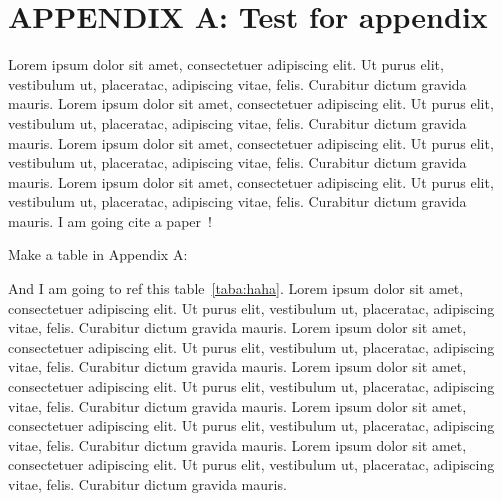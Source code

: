 \newcommand{\hbAppendixPrefix}{A}
\renewcommand{\thefigure}{\hbAppendixPrefix.\arabic{figure}}
\setcounter{figure}{0}
\renewcommand{\thetable}{\hbAppendixPrefix.\arabic{table}} 
\setcounter{table}{0}

\section{APPENDIX \hbAppendixPrefix: Test for appendix}

Lorem ipsum dolor sit amet, consectetuer adipiscing elit.  Ut purus elit, vestibulum ut, placeratac,  adipiscing vitae,  felis.   Curabitur dictum gravida mauris.  
Lorem ipsum dolor sit amet, consectetuer adipiscing elit.  Ut purus elit, vestibulum ut, placeratac,  adipiscing vitae,  felis.   Curabitur dictum gravida mauris.  
Lorem ipsum dolor sit amet, consectetuer adipiscing elit.  Ut purus elit, vestibulum ut, placeratac,  adipiscing vitae,  felis.   Curabitur dictum gravida mauris.  
Lorem ipsum dolor sit amet, consectetuer adipiscing elit.  Ut purus elit, vestibulum ut, placeratac,  adipiscing vitae,  felis.   Curabitur dictum gravida mauris.  
I am going cite a paper~\parencite{zuo2018more}!



Make a table in Appendix A:

And I am going to ref this table~\cref{taba:haha}.
Lorem ipsum dolor sit amet, consectetuer adipiscing elit.  Ut purus elit, vestibulum ut, placeratac,  adipiscing vitae,  felis.   Curabitur dictum gravida mauris.  
Lorem ipsum dolor sit amet, consectetuer adipiscing elit.  Ut purus elit, vestibulum ut, placeratac,  adipiscing vitae,  felis.   Curabitur dictum gravida mauris.  
Lorem ipsum dolor sit amet, consectetuer adipiscing elit.  Ut purus elit, vestibulum ut, placeratac,  adipiscing vitae,  felis.   Curabitur dictum gravida mauris.  
Lorem ipsum dolor sit amet, consectetuer adipiscing elit.  Ut purus elit, vestibulum ut, placeratac,  adipiscing vitae,  felis.   Curabitur dictum gravida mauris.  
Lorem ipsum dolor sit amet, consectetuer adipiscing elit.  Ut purus elit, vestibulum ut, placeratac,  adipiscing vitae,  felis.   Curabitur dictum gravida mauris.  
